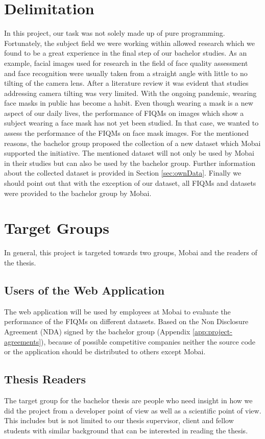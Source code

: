 \section{Delimitation}
\label{sec:delimit}
In this project, our task was not solely made up of pure programming. Fortunately, the subject field we were working within allowed research which we found to be a great experience in the final step of our bachelor studies. As an example, facial images used for research in the field of face quality assessment and face recognition were usually taken from a straight angle with little to no tilting of the camera lens. After a literature review it was evident that studies addressing camera tilting was very limited. With the ongoing pandemic, wearing face masks in public has become a habit. Even though wearing a mask is a new aspect of our daily lives, the performance of FIQMs on images which show a subject wearing a face mask has not yet been studied. In that case, we wanted to assess the performance of the FIQMs on face mask images. For the mentioned reasons, the bachelor group proposed the collection of a new dataset which Mobai supported the initiative. The mentioned dataset will not only be used by Mobai in their studies but can also be used by the bachelor group. Further information about the collected dataset is provided in Section \ref{sec:ownData}. Finally we should point out that with the exception of our dataset, all FIQMs and datasets were provided to the bachelor group by Mobai. 

\section{Target Groups}
\label{sec:TargetGroups}
In general, this project is targeted towards two groups, Mobai and the readers of the thesis. 

\subsection{Users of the Web Application}
The web application will be used by employees at Mobai to evaluate the performance of the FIQMs on different datasets. Based on the Non Disclosure Agreement (NDA) signed by the bachelor group (Appendix \ref{app:project-agreements}), because of possible competitive companies neither the source code or the application should be distributed to others except Mobai.

\subsection{Thesis Readers}
The target group for the bachelor thesis are people who need insight in how we did the project from a developer point of view as well as a scientific point of view. This includes but is not limited to our thesis supervisor, client and fellow students with similar background that can be interested in reading the thesis.

